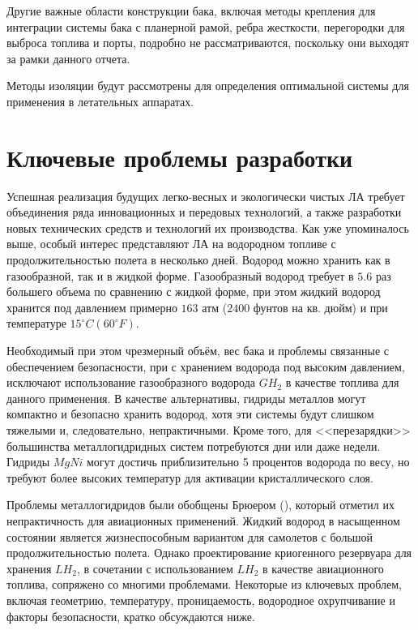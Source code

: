 Другие важные области конструкции бака, включая методы крепления для интеграции системы бака с планерной рамой, ребра жесткости, перегородки для выброса топлива и порты, подробно не рассматриваются, поскольку они выходят за рамки данного отчета.

Методы изоляции будут рассмотрены для определения оптимальной системы для применения в летательных аппаратах. 

\section{Ключевые проблемы разработки}\label{ch:overview:1:sec2}

Успешная реализация будущих легко-весных и экологически чистых ЛА требует объединения ряда инновационных и передовых технологий, а также разработки новых технических средств и технологий их производства. Как уже упоминалось выше, особый интерес представляют ЛА на водородном топливе с продолжительностью полета в несколько дней. Водород можно хранить как в газообразной, так и в жидкой форме. Газообразный водород требует в \(5.6\) раз большего объема по сравнению с жидкой форме, при этом жидкий водород хранится под давлением примерно \(163\) атм (\(2400\) фунтов на кв. дюйм) и при температуре \(15^{\circ}C (60^{\circ}F)\).

Необходимый при этом чрезмерный объём, вес бака и проблемы связанные с обеспечением безопасности, при с хранением водорода под высоким давлением, исключают использование газообразного водорода \(GH_2\) в качестве топлива для данного применения. В качестве альтернативы, гидриды металлов могут компактно и безопасно хранить водород, хотя эти системы будут слишком тяжелыми и, следовательно, непрактичными. Кроме того, для <<перезарядки>> большинства металлогидридных систем потребуются дни или даже недели. Гидриды \(MgNi\) могут достичь приблизительно 5 процентов водорода по весу, но требуют более высоких температур для активации кристаллического слоя.

Проблемы металлогидридов были обобщены Брюером (\cite{brewer1991}), который отметил их непрактичность для авиационных применений. Жидкий водород в насыщенном состоянии является жизнеспособным вариантом для самолетов с большой продолжительностью полета. Однако проектирование криогенного резервуара для хранения \(LH_2\), в сочетании с использованием \(LH_2\) в качестве авиационного топлива, сопряжено со многими проблемами. Некоторые из ключевых проблем, включая геометрию, температуру, проницаемость, водородное охрупчивание и факторы безопасности, кратко обсуждаются ниже.

